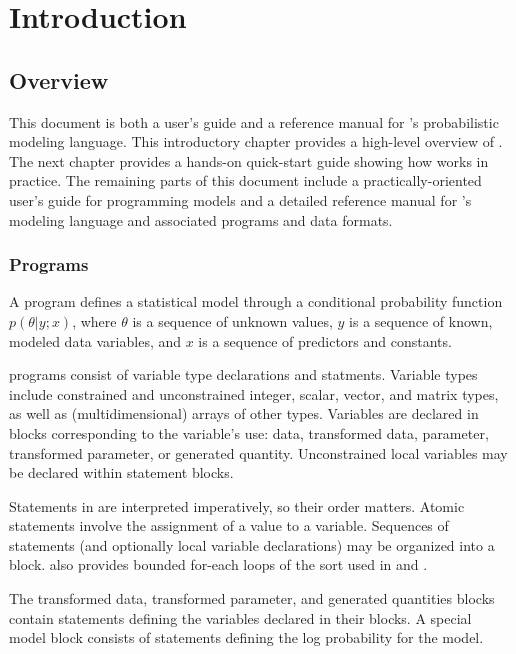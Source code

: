 \part{Introduction}


\chapter{Overview}

\noindent
This document is both a user's guide and a reference manual for
\Stan's probabilistic modeling language.  This introductory chapter
provides a high-level overview of \Stan.  The next chapter provides a
hands-on quick-start guide showing how \Stan works in practice.  The
remaining parts of this document include a practically-oriented user's
guide for programming models and a detailed reference manual for
\Stan's modeling language and associated programs and data formats.

\section{\Stan Programs}

A \Stan program defines a statistical model through a conditional
probability function $p(\theta|y;x)$, where $\theta$ is a sequence of
unknown values, $y$ is a sequence of known, modeled data variables,
and $x$ is a sequence of predictors and constants.

\Stan programs consist of variable type declarations and statments.
Variable types include constrained and unconstrained integer, scalar,
vector, and matrix types, as well as (multidimensional) arrays of
other types.  Variables are declared in blocks corresponding to the
variable's use: data, transformed data, parameter, transformed
parameter, or generated quantity.  Unconstrained local variables may
be declared within statement blocks.

Statements in \Stan are interpreted imperatively, so their order
matters.  Atomic statements involve the assignment of a value to a
variable.  Sequences of statements (and optionally local variable
declarations) may be organized into a block.  \Stan also provides bounded
for-each loops of the sort used in \R and \BUGS.

The transformed data, transformed parameter, and generated quantities
blocks contain statements defining the variables declared in their
blocks.  A special model block consists of statements defining the log
probability for the model.

